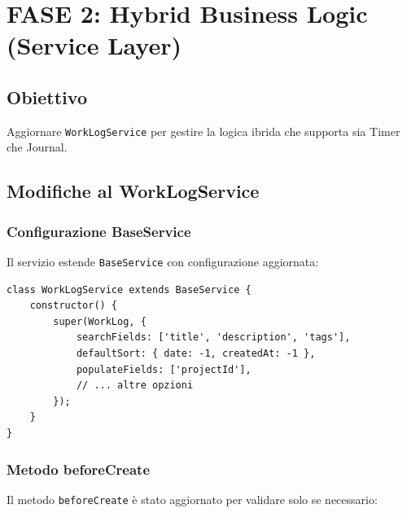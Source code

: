 \documentclass[11pt,a4paper]{article}
\begin{document}
\section{FASE 2: Hybrid Business Logic (Service Layer)}

\subsection{Obiettivo}

Aggiornare \texttt{WorkLogService} per gestire la logica ibrida che supporta sia Timer che Journal.

\subsection{Modifiche al WorkLogService}

\subsubsection{Configurazione BaseService}

Il servizio estende \texttt{BaseService} con configurazione aggiornata:

\begin{lstlisting}[caption=Configurazione WorkLogService]
class WorkLogService extends BaseService {
    constructor() {
        super(WorkLog, {
            searchFields: ['title', 'description', 'tags'],
            defaultSort: { date: -1, createdAt: -1 },
            populateFields: ['projectId'],
            // ... altre opzioni
        });
    }
}
\end{lstlisting}

\subsubsection{Metodo beforeCreate}

Il metodo \texttt{beforeCreate} è stato aggiornato per validare solo se necessario:
\end{document}
